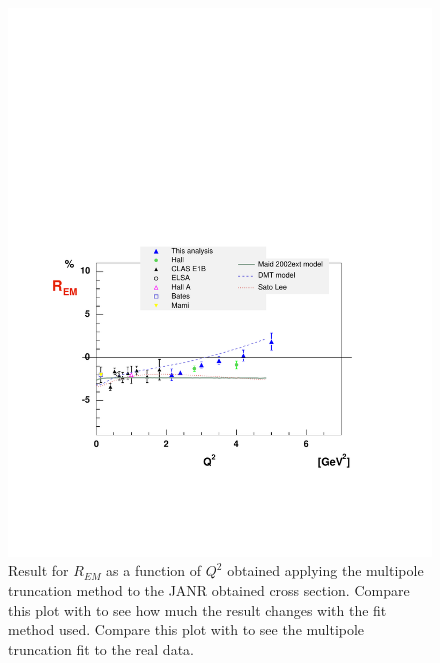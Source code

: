 \begin{figure}[h]
 \begin{center}
 \includegraphics[width = 13cm, bb=30 130 540 500]{analysis/img/JANR_truncated} 
  \caption[JANR truncated result for $R_{EM}$ as a function of $Q^2$]
{  Result for $R_{EM}$ as a function of $Q^2$ obtained applying the multipole truncation method
  to the JANR obtained cross section. Compare this plot with  to see how much the 
  result changes with the fit method used. Compare this plot with  to see the multipole
  truncation fit to the real data.}
 \label{fig:JANRREMtrunc}
\end{center}
\end{figure}
 

\cia
